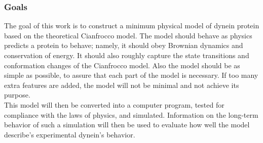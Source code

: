 \documentclass[10pt]{article} %
\begin{document}
\subsubsection{Goals}
The goal of this work is to construct a minimum physical model of dynein protein based on the theoretical Cianfrocco model. The model should behave as physics predicts a protein to behave; namely, it should obey Brownian dynamics and conservation of energy. It should also roughly capture the state transitions and conformation changes of the Cianfrocco model. Also the model should be as simple as possible, to assure that each part of the model is necessary. If too many extra features are added, the model will not be minimal and not achieve its purpose.\\

This model will then be converted into a computer program, tested for compliance with the laws of physics, and simulated. Information on the long-term behavior of such a simulation will then be used to evaluate how well the model describe's experimental dynein's behavior.\\



\end{document}
